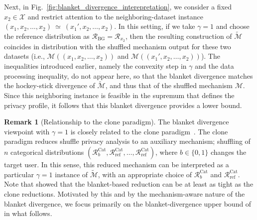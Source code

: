 \documentclass{article}
\theoremstyle{plain}
\theoremstyle{definition}
\newtheorem{remark}[theorem]{Remark}
\begin{document}
Next, in Fig.~\ref{fig:blanket_divergence_interepretation}, we consider a fixed $x_2\in\mathcal X$ and restrict attention to the neighboring-dataset instance
$
(x_1,x_2,\dots,x_2)\ \simeq\ (x_1',x_2,\dots,x_2).
$
In this setting, if we take $\gamma=1$ and choose the reference distribution as $\mathcal R_{\mathrm{BG}}=\mathcal R_{x_2}$, then the resulting construction of $\widetilde{\mathcal M}$ coincides in distribution with the  shuffled mechanism output for these two datasets (i.e., $\mathcal{M}((x_1,x_2,\dots,x_2))$ and $\mathcal{M}((x_1',x_2,\dots,x_2))$). 
The inequalities introduced earlier, namely the convexity step in $\gamma$ and the data processing inequality, do not appear here, so that the blanket divergence matches the hockey-stick divergence of $\widetilde{\mathcal{M}}$, and thus that of the shuffled mechanism $\mathcal{M}$.
Since this neighboring instance is feasible in the supremum that defines the privacy profile, it follows that this blanket divergence provides a lower bound.


\begin{remark}[Relationship to the clone paradigm]
\label{remark:clone_paradigm}
The blanket divergence viewpoint with $\gamma=1$ is closely related to the clone paradigm~\cite{feldmanHidingClonesSimple2022,feldmanStrongerPrivacyAmplification2023a}.
The clone paradigm reduces shuffle privacy analysis to an auxiliary mechanism; shuffling of $n$ categorical distributions $(\mathcal{R}^{\mathrm{Cat}}_{b}, \mathcal{R}^{\mathrm{Cat}}_{\mathrm{ref}}, \dots, \mathcal{R}^{\mathrm{Cat}}_{\mathrm{ref}})$, where $b\in\{0,1\}$ changes the target user.
In this sense, this reduced mechanism can be interpreted as a particular $\gamma=1$ instance of $\widetilde{\mathcal{M}}$, with an appropriate choice of $\mathcal R^{\mathrm{Cat}}_{b}$ and $\mathcal R^{\mathrm{Cat}}_{\mathrm{ref}}$.
Note that \citet{suDecompositionBasedOptimalBounds2025} showed that the blanket-based reduction can be at least as tight as the clone reductions.
Motivated by this and by the mechanism-aware nature of the blanket divergence, we focus primarily on the blanket-divergence upper bound of
\citet{ballePrivacyBlanketShuffle2019} in what follows.
\end{remark}
\end{document}
